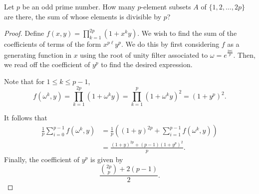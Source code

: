 \documentclass[11pt]{article}
\renewcommand{\>}{\rangle}
\newcommand{\<}{\langle}
\begin{document}
\begin{problem}[IMO 1995/6] Let $p$ be an odd prime number. How many $p$-element subsets $ A$ of $ \{1,2,\dots,2p\}$ are there, the sum of whose elements is divisible by $p$?
\end{problem}
\begin{proof}
Define $f(x, y) = \prod_{k=1}^{2p} (1 + x^k y)$.  We wish to find the sum of the coefficients of terms of the form $x^{p \ell} y^p$.  We do this by first considering $f$ as a generating function in $x$ using the root of unity filter associated to $\omega = e^{\frac{2\pi i }{p}}$.   Then, we read off the coefficient of $y^p$ to find the desired expression.

Note that for $1 \le k \le p-1$, 
$$f(\omega^k, y) = \prod_{k=1}^{2p} (1 + \omega^k y) = \prod_{k=1}^{p} (1 + \omega^k y)^2 = (1 + y^p)^2.$$

It follows that 
\begin{align*}
\frac{1}{p} \sum_{i=0}^{p-1} f(\omega^k, y) &= \frac{1}{p} \left ((1 +y)^{2p} + \sum_{i=1}^{p-1} f(\omega^k, y) \right) \\
&= \frac{(1 + y)^{2p} + (p-1)(1 + y^p)^2}{p}.
\end{align*}
Finally, the coefficient of $y^p$ is given by 
$$\frac{\binom{2p}{p} + 2(p-1)}{2}.$$
\end{proof}
 
\end{document}
